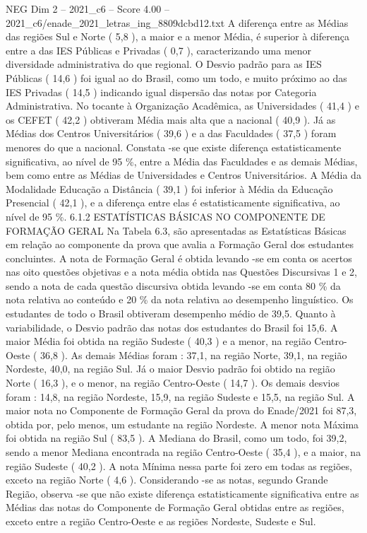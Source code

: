 \begin{textsample}{NEG Dim 2 – 2021\_c6 – Score 4.00 – 2021\_c6/enade\_2021\_letras\_ing\_8809dcbd12.txt}
A diferença entre as Médias das regiões Sul e Norte ( 5,8 ), a maior e a menor Média, é superior à diferença entre a das IES Públicas e Privadas ( 0,7 ), caracterizando uma menor diversidade administrativa do que regional.
O Desvio padrão para as IES Públicas ( 14,6 ) foi igual ao do Brasil, como um todo, e muito próximo ao das IES Privadas ( 14,5 ) indicando igual dispersão das notas por Categoria Administrativa.
No tocante à Organização Acadêmica, as Universidades ( 41,4 ) e os CEFET ( 42,2 ) obtiveram Média mais alta que a nacional ( 40,9 ).
Já as Médias dos Centros Universitários ( 39,6 ) e a das Faculdades ( 37,5 ) foram menores do que a nacional.
Constata -se que existe diferença estatisticamente significativa, ao nível de 95 \%, entre a Média das Faculdades e as demais Médias, bem como entre as Médias de Universidades e Centros Universitários.
A Média da Modalidade Educação a Distância ( 39,1 ) foi inferior à Média da Educação Presencial ( 42,1 ), e a diferença entre elas é estatisticamente significativa, ao nível de 95 \%. 6.1.2 ESTATÍSTICAS BÁSICAS NO COMPONENTE DE FORMAÇÃO GERAL Na Tabela 6.3, são apresentadas as Estatísticas Básicas em relação ao componente da prova que avalia a Formação Geral dos estudantes concluintes.
A nota de Formação Geral é obtida levando -se em conta os acertos nas oito questões objetivas e a nota média obtida nas Questões Discursivas 1 e 2, sendo a nota de cada questão discursiva obtida levando -se em conta 80 \% da nota relativa ao conteúdo e 20 \% da nota relativa ao desempenho linguístico.
Os estudantes de todo o Brasil obtiveram desempenho médio de 39,5.
Quanto à variabilidade, o Desvio padrão das notas dos estudantes do Brasil foi 15,6.
A maior Média foi obtida na região Sudeste ( 40,3 ) e a menor, na região Centro-Oeste ( 36,8 ).
As demais Médias foram : 37,1, na região Norte, 39,1, na região Nordeste, 40,0, na região Sul.
Já o maior Desvio padrão foi obtido na região Norte ( 16,3 ), e o menor, na região Centro-Oeste ( 14,7 ).
Os demais desvios foram : 14,8, na região Nordeste, 15,9, na região Sudeste e 15,5, na região Sul.
A maior nota no Componente de Formação Geral da prova do Enade/2021 foi 87,3, obtida por, pelo menos, um estudante na região Nordeste.
A menor nota Máxima foi obtida na região Sul ( 83,5 ).
A Mediana do Brasil, como um todo, foi 39,2, sendo a menor Mediana encontrada na região Centro-Oeste ( 35,4 ), e a maior, na região Sudeste ( 40,2 ).
A nota Mínima nessa parte foi zero em todas as regiões, exceto na região Norte ( 4,6 ).
Considerando -se as notas, segundo Grande Região, observa -se que não existe diferença estatisticamente significativa entre as Médias das notas do Componente de Formação Geral obtidas entre as regiões, exceto entre a região Centro-Oeste e as regiões Nordeste, Sudeste e Sul.

\end{textsample}
